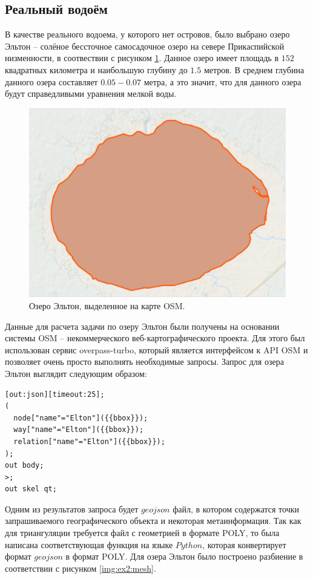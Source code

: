 \documentclass[14pt]{extreport}
\begin{document}
\subsection{Реальный водоём}


В качестве реального водоема, у которого нет островов, было выбрано озеро Эльтон -- солёное бессточное самосадочное озеро на севере Прикаспийской низменности, в соотвествии с рисунком \ref{img:lake:elton}. Данное озеро имеет площадь в $152$ квадратных километра и наибольшую глубину до $1.5$ метров. В среднем глубина данного озера составляет $0.05 - 0.07$ метра, а это значит, что для данного озера будут справедливыми уравнения мелкой воды.

\begin{figure}[H]
\centerline{
\includegraphics[width=0.6\linewidth]{images/ex2/lake_elton}}
\caption{Озеро Эльтон, выделенное на карте OSM.}
\label{img:lake:elton}
\end{figure}

Данные для расчета задачи по озеру Эльтон были получены на основании системы OSM\cite{bib:website:osm} -- некоммерческого веб-картографического проекта. Для этого был использован сервис overpass-turbo\cite{bib:website:overpassturbo}, который является интерфейсом к API OSM и позволяет очень просто выполнять необходимые запросы. Запрос для озера Эльтон выглядит следующим образом:

\begin{lstlisting}[frame=single]
[out:json][timeout:25];
(
  node["name"="Elton"]({{bbox}});
  way["name"="Elton"]({{bbox}});
  relation["name"="Elton"]({{bbox}});
);
out body;
>;
out skel qt;	
\end{lstlisting}

Одним из результатов запроса будет $geojson$ файл, в котором содержатся точки запрашиваемого географического объекта и некоторая метаинформация. Так как для триангуляции требуется файл с геометрией в формате POLY, то была написана соответствующая функция на языке $Python$, которая конвертирует формат $geojson$ в формат POLY. Для озера Эльтон было построено разбиение в соответствии с рисунком \ref{img:ex2:mesh}.
\end{document}
